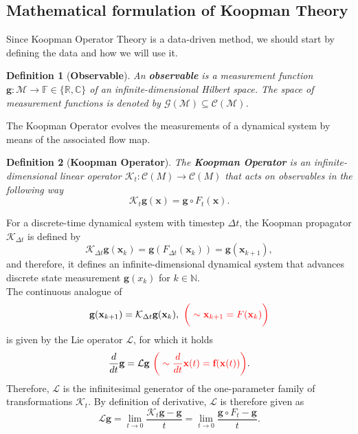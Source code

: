 \documentclass[]{article}
\newtheorem{definition}{Definition}
\begin{document}
\subsection{Mathematical formulation of Koopman Theory}
Since Koopman Operator Theory is a data-driven method, we should start by defining the data and how we will use it.
\begin{definition}[\textbf{Observable}]
An \textbf{observable} is a measurement function $\textbf{g}:\mathcal{M} \to \mathbb{F} \in \{\mathbb{R}, \mathbb{C}\}$ of an infinite-dimensional Hilbert space. The space of measurement functions is denoted by $\mathcal{G}(\mathcal{M}) \subseteq \mathcal{C}(\mathcal{M})$.
\end{definition}
The Koopman Operator evolves the measurements of a dynamical system by means of the associated flow map.
\begin{definition}[\textbf{Koopman Operator}]
The \textbf{Koopman Operator} is an infinite-dimensional linear operator $\mathcal{K}_t: \mathcal{C}(M) \to \mathcal{C}(M)$ that acts on observables in the following way
\begin{equation}
	\mathcal{K}_t \textbf{g}(\textbf{x}) = \textbf{g} \circ F_t (\textbf{x}).
\end{equation}
\end{definition}
For a discrete-time dynamical system with timestep $\Delta t$, the Koopman propagator $\mathcal{K}_{\Delta t}$ is defined by
\begin{equation}
	\mathcal{K}_{\Delta t} \textbf{g}(\textbf{x}_k) = \textbf{g}(F_{\Delta t}(\textbf{x}_k)) = \textbf{g}(\textbf{x}_{k+1}),
\end{equation}
and therefore, it defines an infinite-dimensional dynamical system that advances discrete state measurement $\textbf{g}(x_k)$ for $k \in \mathbb{N}$. \\
The continuous analogue of 
\begin{equation}
	\textbf{g}(\textbf{x}_{k+1}) = \mathcal{K}_{\Delta t} \textbf{g}(\textbf{x}_k), \,\, \text{$\color{red} \bigg(\sim \textbf{x}_{k+1} = F (\textbf{x}_k)\bigg)$}
\end{equation}
is given by the Lie operator $\mathcal{L}$, for which it holds
\begin{equation}
	\frac{d}{dt} \textbf{g} = \mathcal{L} \textbf{g} \,\, \text{$\color{red} \bigg(\sim \frac{d}{dt} \textbf{x}(t) = \textbf{f}(\textbf{x}(t))\bigg)$}.
\end{equation}
Therefore, $\mathcal{L}$ is the infinitesimal generator of the one-parameter family of transformations $\mathcal{K}_t$. By definition of derivative, $\mathcal{L}$ is therefore given as
\begin{equation}
	\mathcal{L}\textbf{g}=\lim_{t \to 0} \frac{\mathcal{K}_t\textbf{g}-\textbf{g}}{t}=\lim_{t \to 0} \frac{\textbf{g} \circ F_t-\textbf{g}}{t}.
\end{equation}
\end{document}
